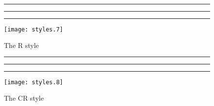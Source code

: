 \begin{figure}
\hrule\vspace*{-0.25ex}
\caption{The R style}\label{fig:s7}
\vspace*{0.35ex}\hrule\vspace*{0.25ex}\hrule
\centering
\texttt{[image: styles.7]}
\end{figure}

\begin{figure}
\hrule\vspace*{-0.25ex}
\caption{The CR style}\label{fig:s8}
\vspace*{0.35ex}\hrule\vspace*{0.25ex}\hrule
\centering
\texttt{[image: styles.8]}
\end{figure}
